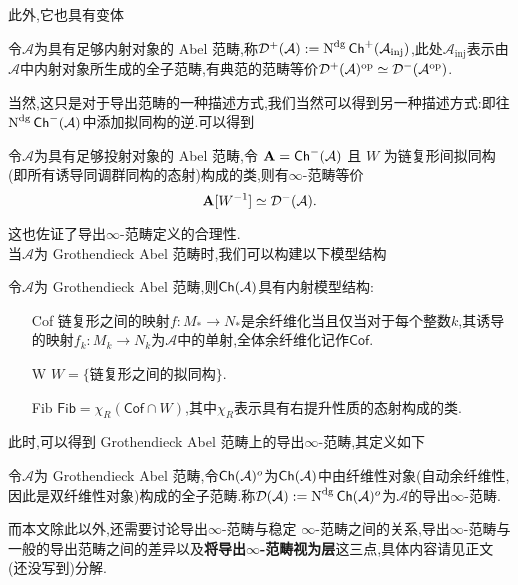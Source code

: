 此外,它也具有变体
\begin{definition*}
    令$\mathcal{A}$为具有足够内射对象的 Abel 范畴,称$\mathcal{D}^+(\mathcal{A}) := \operatorname{N}^{\operatorname{dg}}\mathsf{Ch}^+(\mathcal{A}_{\operatorname{inj}})$,此处$\mathcal{A}_{\operatorname{inj}}$表示由$\mathcal{A}$中内射对象所生成的全子范畴,有典范的范畴等价$\mathcal{D}^+(\mathcal{A})^{\operatorname{op}} \simeq \mathcal{D}^-(\mathcal{A}^{\operatorname{op}})$.
\end{definition*}
当然,这只是对于导出范畴的一种描述方式,我们当然可以得到另一种描述方式:即往$\operatorname{N}^{\operatorname{dg}} \mathsf{Ch}^-(\mathcal{A})$中添加拟同构的逆.可以得到
\begin{theorem*}
    令$\mathcal{A}$为具有足够投射对象的 Abel 范畴,令 $\bold{A} = \mathsf{Ch}^-(\mathcal{A})$ 且 $W$ 为链复形间拟同构(即所有诱导同调群同构的态射)构成的类,则有$\infty$-范畴等价
    \[
        \bold{A}[W^{-1}]\simeq \mathcal{D}^-(\mathcal{A}).
    \]
\end{theorem*}
这也佐证了导出$\infty$-范畴定义的合理性.\\

当$\mathcal{A}$为 Grothendieck Abel 范畴时,我们可以构建以下模型结构
\begin{proposition*}
    令$\mathcal{A}$为 Grothendieck Abel 范畴,则$\mathsf{Ch}(\mathcal{A})$具有内射模型结构:
    \begin{enumerate}
        \item[Cof] 链复形之间的映射$f: M_* \to N_*$是余纤维化当且仅当对于每个整数$k$,其诱导的映射$f_k : M_k \to N_k$为$\mathcal{A}$中的单射,全体余纤维化记作$\mathsf{Cof}$.
        \item[W] $W = \{\text{链复形之间的拟同构}\}$.
        \item[Fib] $\mathsf{Fib} = \chi_R(\mathsf{Cof}\cap W)$,其中$\chi_R$表示具有右提升性质的态射构成的类.
    \end{enumerate}
\end{proposition*}
此时,可以得到 Grothendieck Abel 范畴上的导出$\infty$-范畴,其定义如下
\begin{definition*}
    令$\mathcal{A}$为 Grothendieck Abel 范畴,令$\mathsf{Ch}(\mathcal{A})^{o}$为$\mathsf{Ch}(\mathcal{A})$中由纤维性对象(自动余纤维性,因此是双纤维性对象)构成的全子范畴.称$\mathcal{D}(\mathcal{A}) := \operatorname{N}^{\operatorname{dg}}\mathsf{Ch}(\mathcal{A})^o$为$\mathcal{A}$的导出$\infty$-范畴.
\end{definition*}
而本文除此以外,还需要讨论导出$\infty$-范畴与稳定 $\infty$-范畴之间的关系,导出$\infty$-范畴与一般的导出范畴之间的差异以及\textbf{将导出$\infty$-范畴视为层}这三点,具体内容请见正文(还没写到)分解.
